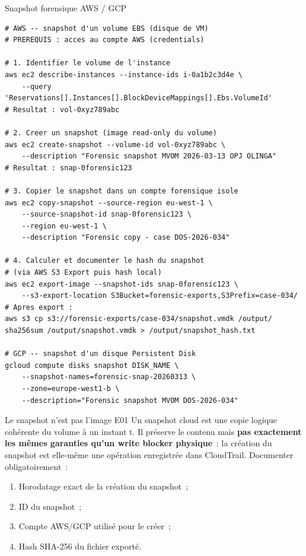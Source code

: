 \begin{boxoutils}{Snapshot forensique AWS / GCP}
\begin{lstlisting}[language=bash_forensique]
# AWS -- snapshot d'un volume EBS (disque de VM)
# PREREQUIS : acces au compte AWS (credentials)

# 1. Identifier le volume de l'instance
aws ec2 describe-instances --instance-ids i-0a1b2c3d4e \
    --query 'Reservations[].Instances[].BlockDeviceMappings[].Ebs.VolumeId'
# Resultat : vol-0xyz789abc

# 2. Creer un snapshot (image read-only du volume)
aws ec2 create-snapshot --volume-id vol-0xyz789abc \
    --description "Forensic snapshot MVOM 2026-03-13 OPJ OLINGA"
# Resultat : snap-0forensic123

# 3. Copier le snapshot dans un compte forensique isole
aws ec2 copy-snapshot --source-region eu-west-1 \
    --source-snapshot-id snap-0forensic123 \
    --region eu-west-1 \
    --description "Forensic copy - case DOS-2026-034"

# 4. Calculer et documenter le hash du snapshot
# (via AWS S3 Export puis hash local)
aws ec2 export-image --snapshot-ids snap-0forensic123 \
    --s3-export-location S3Bucket=forensic-exports,S3Prefix=case-034/
# Apres export :
aws s3 cp s3://forensic-exports/case-034/snapshot.vmdk /output/
sha256sum /output/snapshot.vmdk > /output/snapshot_hash.txt

# GCP -- snapshot d'un disque Persistent Disk
gcloud compute disks snapshot DISK_NAME \
    --snapshot-names=forensic-snap-20260313 \
    --zone=europe-west1-b \
    --description="Forensic snapshot MVOM DOS-2026-034"
\end{lstlisting}
\end{boxoutils}

\begin{boiteRemarque}{Le snapshot n'est pas l'image E01}
Un snapshot cloud est une copie logique cohérente du volume à un instant t.
Il préserve le contenu mais \textbf{pas exactement les mêmes garanties
qu'un write blocker physique}~: la création du snapshot est elle-même
une opération enregistrée dans CloudTrail. Documenter obligatoirement~:
\begin{enumerate}
    \item Horodatage exact de la création du snapshot~;
    \item ID du snapshot~;
    \item Compte AWS/GCP utilisé pour le créer~;
    \item Hash SHA-256 du fichier exporté.
\end{enumerate}
\end{boiteRemarque}

